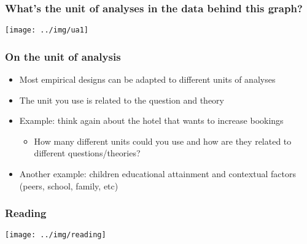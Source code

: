 \documentclass[aspectratio=43]{beamer}
\begin{document}
\begin{frame}
\frametitle{What's the unit of analyses in the data behind this graph?}
\centering

\texttt{[image: ../img/ua1]}

\end{frame}



\begin{frame}
\frametitle{On the unit of analysis}
\centering

\begin{itemize}
  \item Most empirical designs can be adapted to different units of analyses
  \item The unit you use is related to the question and theory
  \item Example: think again about the hotel that wants to increase bookings
  \begin{itemize}
    \item How many different units could you use and how are they related to different questions/theories?
  \end{itemize}
  \item<2-> Another example: children educational attainment and contextual factors (peers, school, family, etc)
\end{itemize}

\end{frame}

\begin{frame}
\frametitle{Reading}
\centering

\texttt{[image: ../img/reading]}

\end{frame}
\end{document}
